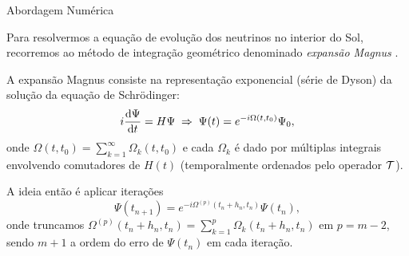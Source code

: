 \documentclass[aspectratio=169]{beamer}
\begin{document}
\begin{frame}{Abordagem Numérica}

Para resolvermos a equação de evolução dos neutrinos no interior do Sol, recorremos ao método de integração geométrico denominado \textit{expansão Magnus} \cite{efficient}.

\n

A expansão Magnus consiste na representação exponencial (série de Dyson) da solução da equação de Schrödinger:
\begin{equation} \label{eq:schrodinger}
i \dv{\Psi}{t} = H \Psi \; \Rightarrow \; \Psi(t) = e^{-i \Omega(t, t_0)} \Psi_0,
\end{equation}
onde $\Omega(t, t_0) = \sum_{k=1}^\infty \Omega_k(t, t_0)$ e cada $\Omega_k$ é dado por múltiplas integrais envolvendo comutadores de $H(t)$ (temporalmente ordenados pelo operador $\mathcal{T}$).

\n

A ideia então é aplicar iterações
\begin{equation} \label{eq:magnus}
\Psi(t_{n+1}) = e^{-i \Omega^{(p)}(t_n + h_n, t_n)} \Psi(t_n),
\end{equation}
onde truncamos $\Omega^{(p)}(t_n + h_n, t_n) = \sum_{k=1}^p \Omega_k(t_n + h_n, t_n)$ em $p = m - 2$, sendo $m + 1$ a ordem do erro de $\Psi(t_n)$ em cada iteração.
\end{frame}
\end{document}
